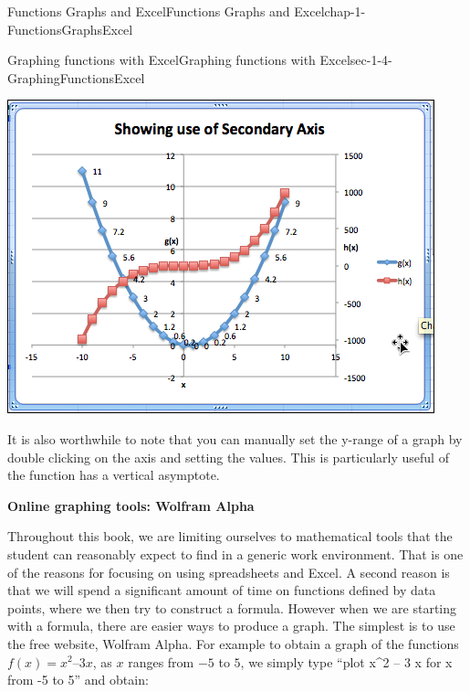 \documentclass[oneside,10pt,]{book}
\newcommand{\terminology}[1]{\textbf{#1}}
\numberwithin{equation}{section}
\begin{document}
\begin{chapterptx}{Functions Graphs and Excel}{}{Functions Graphs and Excel}{}{}{chap-1-FunctionsGraphsExcel}
\begin{sectionptx}{Graphing functions with Excel}{}{Graphing functions with Excel}{}{}{sec-1-4-GraphingFunctionsExcel}
\begin{sidebyside}{1}{0.1}{0.1}{0}
\begin{sbspanel}{0.8}
\includegraphics[width=1\linewidth]{images/sec1-4-13.png}
\end{sbspanel}%
\end{sidebyside}%
\par
\hypertarget{p-337}{}%
It is also worthwhile to note that you can manually set the y-range of a graph by double clicking on the axis and setting the values.  This is particularly useful of the function has a vertical asymptote.%
\par
\hypertarget{p-338}{}%
\terminology{Online graphing tools: Wolfram Alpha}%
\par
\hypertarget{p-339}{}%
Throughout this book, we are limiting ourselves to mathematical tools that the student can reasonably expect to find in a generic work environment.  That is one of the reasons for focusing on using spreadsheets and Excel.  A second reason is that we will spend a significant amount of time on functions defined by data points, where we then try to construct a formula.  However when we are starting with a formula, there are easier ways to produce a graph.  The simplest is to use the free website, Wolfram Alpha.  For example to obtain a graph of the functions \(f(x) = x^2 – 3 x\), as \(x\) ranges from \(-5\) to \(5\), we simply type “plot x\textasciicircum{}2 – 3 x for x from -5 to 5” and obtain:%
\begin{sidebyside}{1}{0.1}{0.1}{0}%
\begin{sbspanel}{0.8}%

\end{sbspanel}
\end{sidebyside}
\end{sectionptx}
\end{chapterptx}
\end{document}
